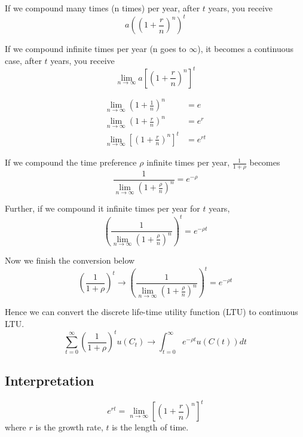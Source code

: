\documentclass[12pt]{article}
\begin{document}
If we compound many times (n times) per year, after $ t $ years, you receive
\begin{equation*}
a \left( (1 + \frac{r}{n})^{n} \right) ^{t}
\end{equation*}

If we compound infinite times per year (n goes to $ \infty  $), it becomes a continuous
case, after $ t $ years, you receive
\begin{equation*}
\lim_{n \to \infty} a \left[  \left( 1 + \frac{r}{n} \right)^{n}  \right] ^{t}
\end{equation*}


\begin{align*}
\lim_{n \to \infty} \left( 1 + \frac{1}{n} \right) ^{n} &= e\\
\lim_{n \to \infty} \left( 1 + \frac{r}{n} \right) ^{n} &= e^{r}\\
\lim_{n \to \infty} \left[ \left( 1 + \frac{r}{n} \right)^{n}  \right] ^{t}&= e^{r t}
\end{align*}

If we compound the time preference $ \rho $ infinite times per year,
$ \frac{1}{1 + \rho} $
becomes
\begin{equation*}
 \frac{1}{ \lim_{n \to \infty}\left( 1 + \frac{\rho}{n} \right) ^{n}} = e^{-\rho}
\end{equation*}

Further, if we compound it infinite times per year for $ t $ years,
\begin{equation*}
\left(  \frac{1}{ \lim_{n \to \infty}\left( 1 + \frac{\rho}{n} \right) ^{n}}  \right) 
^{t} = e^{ - \rho t}
\end{equation*}

Now we finish the conversion below
\begin{equation*}
 \left( \frac{1}{1 + \rho} \right) ^{t}	
\rightarrow 
\left(  \frac{1}{ \lim_{n \to \infty}\left( 1 + \frac{\rho}{n} \right) ^{n}}  \right) 
^{t} = e^{ - \rho t}
\end{equation*}


Hence we can convert the discrete life-time utility function (LTU) to continuous LTU.
\begin{equation*}
\sum\limits_{t = 0} ^\infty \left( \frac{1}{1 + \rho} \right) ^{t} u(C_{t})
\rightarrow
\int_{t = 0}^{\infty } e^{ - \rho t}u(C(t))dt
\end{equation*}




\subsection{Interpretation}
\begin{equation*}
e^{r t} = \lim_{n \to \infty}\left[ 
\left( 1 + \frac{r}{n} \right) ^{n}
\right] ^{t}
\end{equation*}
where $ r $ is the growth rate, $ t $ is the length of time.
\end{document}
